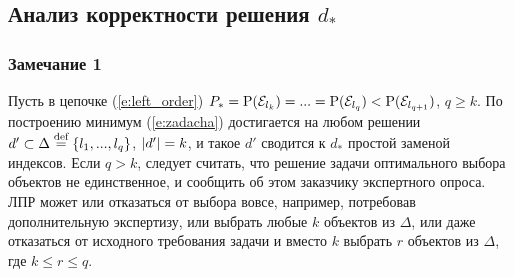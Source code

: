 \documentclass{article}
\begin{document}



\subsection{Анализ корректности решения $d_*$}
\subsubsection*{Замечание 1}

Пусть в цепочке (\ref{e:left_order}) $P_* = {\mathrm{P}}(\mathcal{E}_{l_k}) = ... = {\mathrm{P}}(\mathcal{E}_{l_q}) < {\mathrm{P}}(\mathcal{E}_{l_{q+1}})$, $q \geq k$. По построению минимум (\ref{e:zadacha}) достигается на любом решении $d' \subset \Delta \overset{\text{def}}{=} \{l_1, ..., l_q\}$, $\left| d' \right| = k$, и такое $d'$ сводится к $d_*$ простой заменой индексов. Если $q > k$, следует считать, что решение задачи оптимального выбора объектов не единственное, и сообщить об этом заказчику экспертного опроса. ЛПР может или отказаться от выбора вовсе, например, потребовав дополнительную экспертизу, или выбрать любые $k$ объектов из $\Delta$, или даже отказаться от исходного требования задачи и вместо $k$ выбрать $r$ объектов из $\Delta$, где $k \leq r \leq q$.
\end{document}

